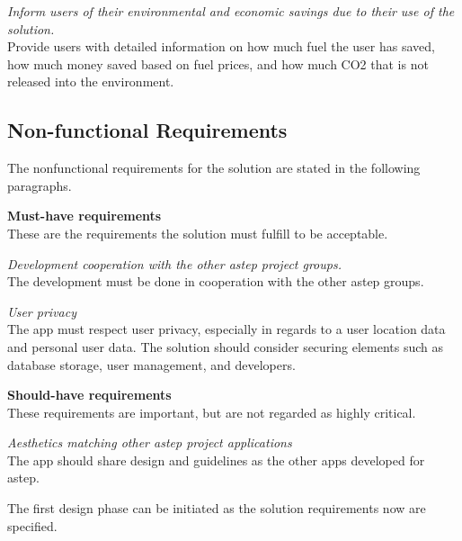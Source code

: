 \textit{Inform users of their environmental and economic savings due to their use of the solution.}\\
Provide users with detailed information on how much fuel the user has saved, how much money saved based on fuel prices, and how much CO2 that is not released into the environment. 

\subsection{Non-functional Requirements}
The nonfunctional requirements for the solution are stated in the following paragraphs.

\textbf{Must-have requirements}\\
These are the requirements the solution must fulfill to be acceptable.

\textit{Development cooperation with the other \gls{astep} project groups.}\\
The development must be done in cooperation with the other \gls{astep} groups.

\textit{User privacy}\\
The app must respect user privacy, especially in regards to a user location data and personal user data.
The solution should consider securing elements such as database storage, user management, and developers.

\textbf{Should-have requirements}\\
These requirements are important, but are not regarded as highly critical.

\textit{Aesthetics matching other \gls{astep} project applications}\\
The app should share design and guidelines as the other apps developed for \gls{astep}.

The first design phase can be initiated as the solution requirements now are specified. 